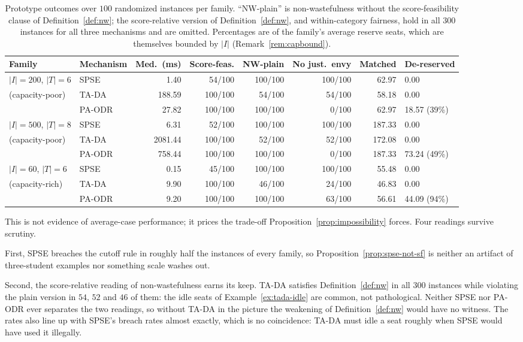 \documentclass[a4paper,twoside]{article}
\theoremstyle{definition}
\begin{document}
\begin{table}[t]
\centering
\caption{Prototype outcomes over $100$ randomized instances per family. ``NW-plain'' is non-wastefulness without the score-feasibility clause of Definition~\ref{def:nw}; the score-relative version of Definition~\ref{def:nw}, and within-category fairness, hold in all $300$ instances for all three mechanisms and are omitted. Percentages are of the family's average reserve seats, which are themselves bounded by $|I|$ (Remark~\ref{rem:capbound}).}
\label{tab:prototype}
\small
\begin{tabular}{|L{0.17\textwidth}|L{0.10\textwidth}|r|r|r|r|r|L{0.14\textwidth}|}
\hline
Family & Mechanism & Med.\ (ms) & Score-feas. & NW-plain & No just.\ envy & Matched & De-reserved \\
\hline
$|I|=200$, $|T|=6$ & SPSE & 1.40 & 54/100 & 100/100 & 100/100 & 62.97 & 0.00 \\
(capacity-poor) & TA-DA & 188.59 & 100/100 & 54/100 & 54/100 & 58.18 & 0.00 \\
 & PA-ODR & 27.82 & 100/100 & 100/100 & 0/100 & 62.97 & 18.57 (39\%) \\
\hline
$|I|=500$, $|T|=8$ & SPSE & 6.31 & 52/100 & 100/100 & 100/100 & 187.33 & 0.00 \\
(capacity-poor) & TA-DA & 2081.44 & 100/100 & 52/100 & 52/100 & 172.08 & 0.00 \\
 & PA-ODR & 758.44 & 100/100 & 100/100 & 0/100 & 187.33 & 73.24 (49\%) \\
\hline
$|I|=60$, $|T|=6$ & SPSE & 0.15 & 45/100 & 100/100 & 100/100 & 55.48 & 0.00 \\
(capacity-rich) & TA-DA & 9.90 & 100/100 & 46/100 & 24/100 & 46.83 & 0.00 \\
 & PA-ODR & 9.20 & 100/100 & 100/100 & 63/100 & 56.61 & 44.09 (94\%) \\
\hline
\end{tabular}
\end{table}

This is not evidence of average-case performance; it prices the trade-off Proposition~\ref{prop:impossibility} forces. Four readings survive scrutiny.

First, SPSE breaches the cutoff rule in roughly half the instances of every family, so Proposition~\ref{prop:spse-not-sf} is neither an artifact of three-student examples nor something scale washes out.

Second, the score-relative reading of non-wastefulness earns its keep. TA-DA satisfies Definition~\ref{def:nw} in all $300$ instances while violating the plain version in $54$, $52$ and $46$ of them: the idle seats of Example~\ref{ex:tada-idle} are common, not pathological. Neither SPSE nor PA-ODR ever separates the two readings, so without TA-DA in the picture the weakening of Definition~\ref{def:nw} would have no witness. The rates also line up with SPSE's breach rates almost exactly, which is no coincidence: TA-DA must idle a seat roughly when SPSE would have used it illegally.
\end{document}
